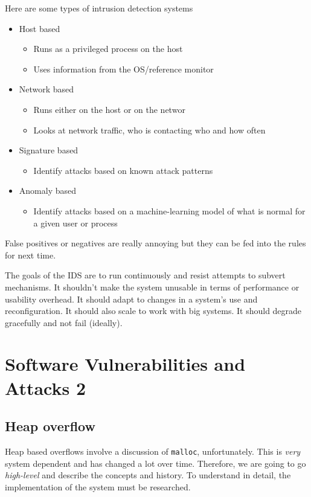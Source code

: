 \documentclass[11pt,a4paper,titlepage,dvipsnames,cmyk]{scrartcl}
\begin{document}
Here are some types of intrusion detection systems
\begin{itemize}
    \item Host based
    \begin{itemize}
        \item Runs as a privileged process on the host
        \item Uses information from the OS/reference monitor
    \end{itemize}
    \item Network based
    \begin{itemize}
        \item Runs either on the host or on the networ
        \item Looks at network traffic, who is contacting who and how often
    \end{itemize}
    \item Signature based
    \begin{itemize}
        \item Identify attacks based on known attack patterns
    \end{itemize}
    \item Anomaly based
    \begin{itemize}
        \item Identify attacks based on a machine-learning model of what is normal for a given user or process
    \end{itemize}
\end{itemize}

False positives or negatives are really annoying but they can be fed into the rules for next time.

The goals of the IDS are to run continuously and resist attempts to subvert mechanisms. It shouldn't make the system unusable in terms of performance or usability overhead. It should adapt to changes in a system's use and reconfiguration. It should also scale to work with big systems. It should degrade gracefully and not fail (ideally).

\section{Software Vulnerabilities and Attacks 2}
\subsection{Heap overflow}
Heap based overflows involve a discussion of \texttt{malloc}, unfortunately. This is \textit{very} system dependent and has changed a lot over time. Therefore, we are going to go \textit{high-level} and describe the concepts and history. To understand in detail, the implementation of the system must be researched.
\end{document}
